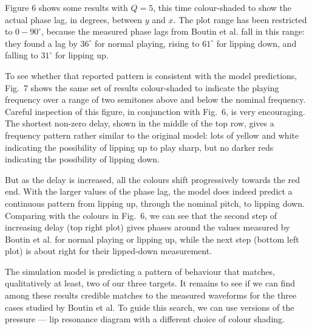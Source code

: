   Figure 6 shows some results with $Q=5$, this time colour-shaded to show the 
  actual phase lag, in degrees, between $y$ and $x$. The plot range has been 
  restricted to $0-90^\circ$, because the measured phase lags from Boutin et 
  al. fall in this range: they found a lag by $36^\circ$ for normal playing, 
  rising to $61^\circ$ for lipping down, and falling to $31^\circ$ for lipping 
  up. 


  To see whether that reported pattern is consistent with the model 
  predictions, Fig.\ 7 shows the same set of results colour-shaded to indicate 
  the playing frequency over a range of two semitones above and below the 
  nominal frequency. Careful inspection of this figure, in conjunction with 
  Fig.\ 6, is very encouraging. The shortest non-zero delay, shown in the 
  middle of the top row, gives a frequency pattern rather similar to the 
  original model: lots of yellow and white indicating the possibility of 
  lipping up to play sharp, but no darker reds indicating the possibility of 
  lipping down. 


  But as the delay is increased, all the colours shift progressively towards 
  the red end. With the larger values of the phase lag, the model does indeed 
  predict a continuous pattern from lipping up, through the nominal pitch, to 
  lipping down. Comparing with the colours in Fig.\ 6, we can see that the 
  second step of increasing delay (top right plot) gives phases around the 
  values measured by Boutin et al. for normal playing or lipping up, while the 
  next step (bottom left plot) is about right for their lipped-down 
  measurement. 

  The simulation model is predicting a pattern of behaviour that matches, 
  qualitatively at least, two of our three targets. It remains to see if we can 
  find among these results credible matches to the measured waveforms for the 
  three cases studied by Boutin et al. To guide this search, we can use 
  versions of the pressure --- lip resonance diagram with a different choice of 
  colour shading. 

